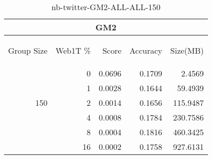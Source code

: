\begin{center}
\begin{table}[htbp] 
 \begin{center}
\begin{tabular}{ | r | r | r | r | r |}
\hline
\multicolumn{5}{|c|}{GM2}\\
\hline
\begin{sideways}Group Size\end{sideways} & \begin{sideways}Web1T \%\end{sideways} & \begin{sideways}Score\end{sideways} & \begin{sideways}Accuracy\end{sideways} & \begin{sideways}Size(MB)\end{sideways}\\
\hline
\multirow{5}{*}{150}
 & 0 & 0.0696 & 0.1709 & 2.4569\\ \cline{2-5}
 & 1 & 0.0028 & 0.1644 & 59.4939\\ \cline{2-5}
 & 2 & 0.0014 & 0.1656 & 115.9487\\ \cline{2-5}
 & 4 & 0.0008 & 0.1784 & 230.7586\\ \cline{2-5}
 & 8 & 0.0004 & 0.1816 & 460.3425\\ \cline{2-5}
 & 16 & 0.0002 & 0.1758 & 927.6131\\ \cline{2-5}
\hline
\end{tabular}
\caption{nb-twitter-GM2-ALL-ALL-150}
\label{table:nb-twitter-GM2-ALL-ALL-150}
\end{center}
 \end{table}
\end{center}

